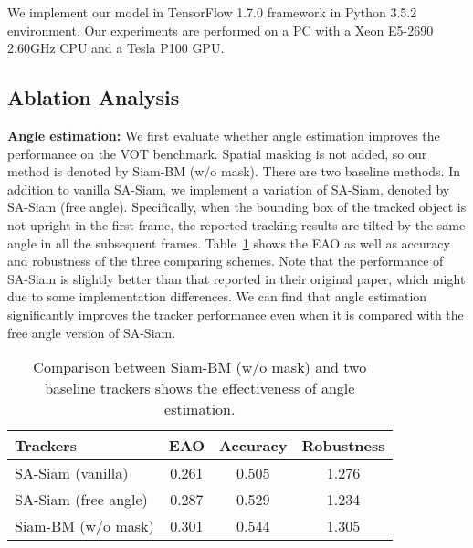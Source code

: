 \documentclass[runningheads]{llncs}
\begin{document}
We implement our model in TensorFlow \cite{Tensorflow} 1.7.0 framework in Python 3.5.2 environment. Our experiments are performed on a PC with a Xeon E5-2690 2.60GHz CPU and a Tesla P100 GPU. 

\subsection{Ablation Analysis}


\textbf{Angle estimation:} We first evaluate whether angle estimation improves the performance on the VOT benchmark. Spatial masking is not added, so our method is denoted by Siam-BM (w/o mask). There are two baseline methods. In addition to vanilla SA-Siam, we implement a variation of SA-Siam, denoted by SA-Siam (free angle). Specifically, when the bounding box of the tracked object is not upright in the first frame, the reported tracking results are tilted by the same angle in all the subsequent frames. Table~\ref{table:poly_cmp} shows the EAO as well as accuracy and robustness of the three comparing schemes. Note that the performance of SA-Siam is slightly better than that reported in their original paper, which might due to some implementation differences. We can find that angle estimation significantly improves the tracker performance even when it is compared with the free angle version of SA-Siam.

\setlength{\tabcolsep}{4pt}
\begin{table}
\begin{center}
\caption{Comparison between Siam-BM (w/o mask) and two baseline trackers shows the effectiveness of angle estimation. }
\label{table:poly_cmp}
\begin{tabular}{|l|ccc|}
\hline
Trackers & EAO & Accuracy & Robustness\\
\hline
SA-Siam (vanilla) & 0.261 & 0.505 & 1.276 \\
SA-Siam (free angle) & 0.287 & 0.529& 1.234\\
\hline
Siam-BM (w/o mask)  & 0.301 & 0.544& 1.305\\
\hline
\end{tabular}
\end{center}
\end{table}
\setlength{\tabcolsep}{1.4pt}
\end{document}
